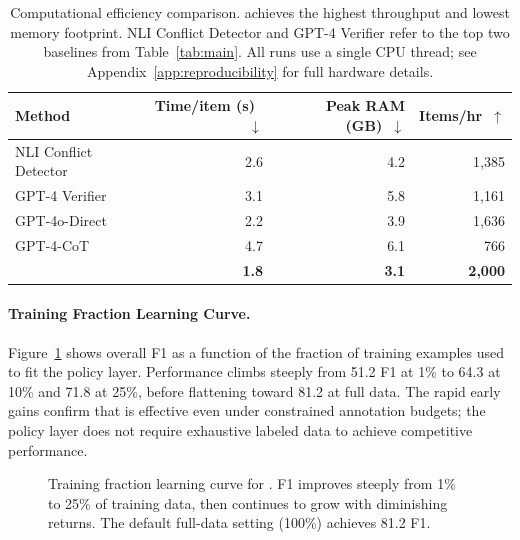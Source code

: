 \begin{table}[t]
\centering
\small
\begin{tabular}{lrrr}
\toprule
Method & Time/item (s)~$\downarrow$ & Peak RAM (GB)~$\downarrow$ & Items/hr~$\uparrow$ \\
\midrule
NLI Conflict Detector & 2.6 & 4.2 & 1{,}385 \\
GPT-4 Verifier        & 3.1 & 5.8 & 1{,}161 \\
GPT-4o-Direct         & 2.2 & 3.9 & 1{,}636 \\
GPT-4-CoT             & 4.7 & 6.1 &   766 \\
\method{}             & \textbf{1.8} & \textbf{3.1} & \textbf{2{,}000} \\
\bottomrule
\end{tabular}
\caption{Computational efficiency comparison. \method{} achieves the highest throughput and lowest memory footprint. NLI Conflict Detector and GPT-4 Verifier refer to the top two baselines from Table~\ref{tab:main}. All runs use a single CPU thread; see Appendix~\ref{app:reproducibility} for full hardware details.}
\label{tab:efficiency}
\end{table}

\paragraph{Training Fraction Learning Curve.}
Figure~\ref{fig:learning-curve} shows overall F1 as a function of the fraction of training examples used to fit the \method{} policy layer. Performance climbs steeply from 51.2 F1 at 1\% to 64.3 at 10\% and 71.8 at 25\%, before flattening toward 81.2 at full data. The rapid early gains confirm that \method{} is effective even under constrained annotation budgets; the policy layer does not require exhaustive labeled data to achieve competitive performance.

\begin{figure}[t]
\centering
{}
\caption{Training fraction learning curve for \method{}. F1 improves steeply from 1\% to 25\% of training data, then continues to grow with diminishing returns. The default full-data setting (100\%) achieves 81.2 F1.}
\label{fig:learning-curve}
\end{figure}

